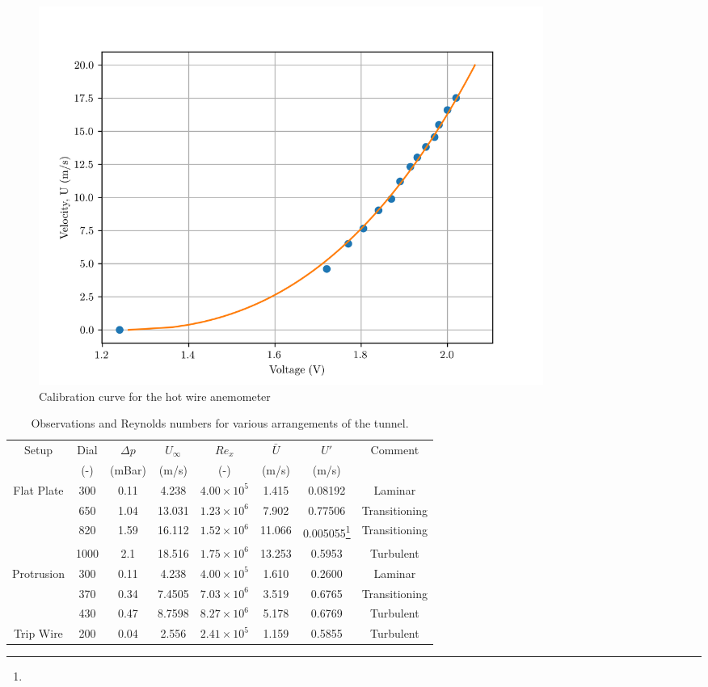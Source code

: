 \documentclass{article}
\begin{document}
\begin{figure}[H]
    \centering
    \includegraphics[width=0.8\textwidth]{calibration.png}
    \caption{Calibration curve for the hot wire anemometer}
    \label{fig:calibration}
\end{figure}


\begin{table}[H]
    \centering
    \begin{tabular}{cccccccc}
        \hline
        \multirow{2}{*}{Setup} &  Dial &  $\Delta p$ &  $U_{\infty}$ &  $Re_x$ & $\bar{U}$ & $U'$ & \multirow{2}{*}{Comment} \\
        &(-)&(mBar)&(m/s)&(-)&(m/s)&(m/s)&  \\
        \hline
        \hline
        \multirow{4}{*}{Flat Plate} & 300 & 0.11 & 4.238 & $4.00 \times 10^5$ & 1.415 & 0.08192 & Laminar \\
        & 650 & 1.04 & 13.031 & $1.23 \times 10^6$ & 7.902 & 0.77506 & Transitioning \\
        & 820 & 1.59 & 16.112 & $1.52 \times 10^6$ & 11.066 & 0.005055\footnote[1]{}  & Transitioning \\
        & 1000 & 2.1 & 18.516 & $1.75 \times 10^6$ & 13.253 & 0.5953 & Turbulent \\
        \hline
        \hline
        \multirow{3}{*}{Protrusion} & 300 & 0.11 & 4.238 & $4.00 \times 10^5$ & 1.610 & 0.2600 & Laminar \\
        & 370 & 0.34 & 7.4505 & $7.03 \times 10^6$ & 3.519 & 0.6765 & Transitioning \\
        & 430 & 0.47 & 8.7598 & $8.27 \times 10^6$ & 5.178 & 0.6769 & Turbulent \\
        \hline
        \hline
        \multirow{1}{*}{Trip Wire} & 200 & 0.04 & 2.556 & $2.41 \times 10^5$ & 1.159 & 0.5855 & Turbulent \\
        \hline
    \end{tabular}
    \caption{Observations and Reynolds numbers for various arrangements of the tunnel.}
    \label{tab:observations}
\end{table}
\end{document}
